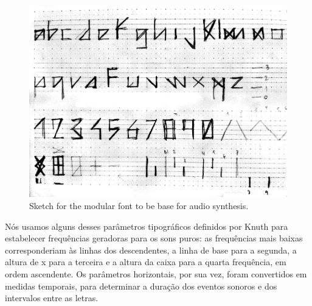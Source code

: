 \begin{figure}[!ht]
   \centering
       \includegraphics[width=1\linewidth]{pictures/audiotype_sketch}
   \caption{Sketch for the modular font to be base for audio synthesis.}
    \label{fig:sketch}
 \end{figure}



Nós usamos alguns desses parâmetros tipográficos definidos por Knuth para estabelecer frequências geradoras para os sons puros: as frequências mais baixas corresponderiam às linhas dos descendentes, a linha de base para a segunda, a altura de x para a terceira e a altura da caixa para a quarta frequência, em ordem ascendente. Os parâmetros horizontais, por sua vez, foram convertidos em medidas temporais, para determinar a duração dos eventos sonoros e dos intervalos entre as letras.


